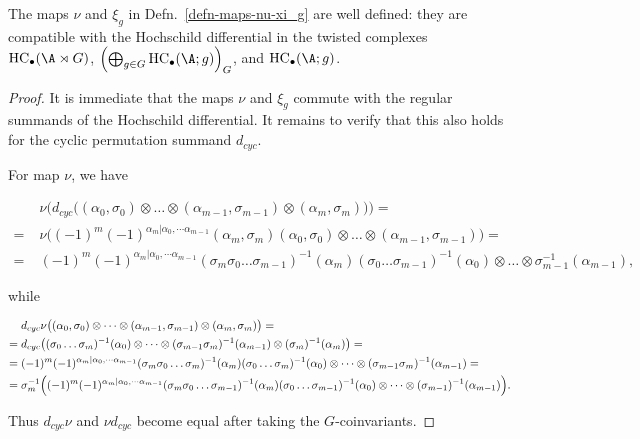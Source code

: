 \documentclass[12pt,a4paper,reqno]{amsart}
\DeclareMathOperator{\hochcx}{{HC}}
\begin{document}
\begin{lemma}
The maps $\nu$ and $\xi_g$ in Defn.~\ref{defn-maps-nu-xi_g} are 
well defined: they are compatible with the Hochschild differential 
in the twisted complexes $\hochcx_\bullet(\A \rtimes G)$, 
$\Bigl( \bigoplus_{ g\in G} \hochcx_{\bullet}(\A;g) \Bigr)_{G}$, 
and $\hochcx_\bullet(\A;g)$.
\end{lemma}
\begin{proof}
It is immediate that the maps 
$\nu$ and $\xi_g$ commute with the regular summands of 
the Hochschild differential. 
It remains to verify that this also holds 
for the cyclic permutation summand $d_{cyc}$. 

For map $\nu$, we have 
\begin{small}
\begin{align*}
& \nu\bigl(
d_{cyc} \bigl((\alpha_0, \sigma_0) \otimes \dots \otimes 
(\alpha_{m-1}, \sigma_{m-1}) \otimes (\alpha_m, \sigma_m) \bigr)\bigr)
=
\\
=\;
& \nu\bigl(
(-1)^{m} (-1)^{\alpha_m | \alpha_0, \dotsm \alpha_{m-1}} 
(\alpha_m, \sigma_m) (\alpha_0, \sigma_0) \otimes \dots \otimes 
(\alpha_{m-1}, \sigma_{m-1})\bigr)
= 
\\
=\; 
& 
(-1)^{m} (-1)^{\alpha_m | \alpha_0, \dotsm \alpha_{m-1}} 
(\sigma_m \sigma_0 \dots \sigma_{m-1})^{-1} (\alpha_m)
(\sigma_0 \dots \sigma_{m-1})^{-1}(\alpha_0) \otimes 
\dots \otimes \sigma_{m-1}^{-1}(\alpha_{m-1}), 
\end{align*}
\end{small}
while 
\begin{small}
\begin{align*}
& d_{cyc} \nu\bigl(
(\alpha_0, \sigma_0) \otimes \dots \otimes 
(\alpha_{m-1}, \sigma_{m-1}) \otimes (\alpha_m, \sigma_m) \bigr)
=
\\
=\;
&
d_{cyc}
\bigl(
(\sigma_0\dots\sigma_m)^{-1}(\alpha_0) \otimes \dots \otimes
(\sigma_{m-1} \sigma_m)^{-1}(\alpha_{m-1}) \otimes
(\sigma_{m})^{-1}(\alpha_m)
\bigr)
=
\\
=\;
&
(-1)^{m} (-1)^{\alpha_m | \alpha_0, \dotsm \alpha_{m-1}} 
(\sigma_{m}\sigma_0\dots\sigma_m)^{-1}(\alpha_m)
(\sigma_0\dots\sigma_m)^{-1}(\alpha_0) \otimes 
\dots \otimes 
(\sigma_{m-1}\sigma_m)^{-1}(\alpha_{m-1}) 
= 
\\
=\;
& \sigma_m^{-1} \Bigl(
(-1)^{m} (-1)^{\alpha_m | \alpha_0, \dotsm \alpha_{m-1}} 
(\sigma_{m}\sigma_0\dots\sigma_{m-1})^{-1}(\alpha_m)
(\sigma_0\dots\sigma_{m-1})^{-1}(\alpha_0) \otimes 
\dots \otimes 
(\sigma_{m-1})^{-1}(\alpha_{m-1}) 
\Bigr).
\end{align*}
\end{small}
Thus $d_{cyc} \nu$ and $\nu d_{cyc}$ become equal after 
taking the $G$-coinvariants.  


\end{proof}
\end{document}
